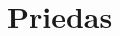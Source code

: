 \documentclass[12pt]{article}
\begin{document}
\newpage





\begin{thebibliography}{99}
\end{thebibliography}
\newpage


\section{Priedas}
\end{document}
